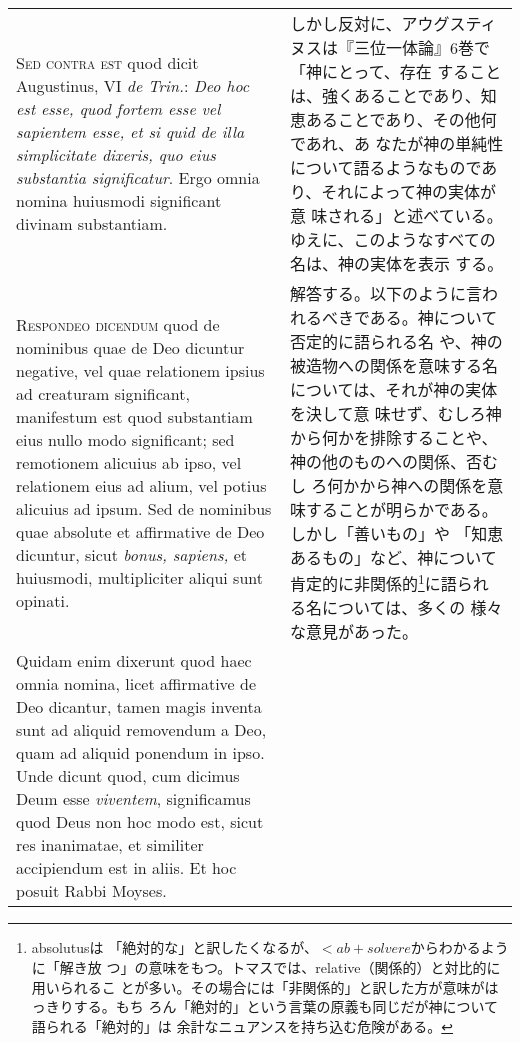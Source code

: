 \documentclass[paper=a4paper,fontsize=10pt,jafontsize=9pt,titlepage]{jlreq}
\begin{document}
\begin{longtable}{p{21em}p{21em}}
\\

{\scshape Sed contra est} quod dicit Augustinus, VI {\itshape de Trin.}: {\itshape
Deo hoc est esse, quod fortem esse vel sapientem esse, et si quid de
illa simplicitate dixeris, quo eius substantia significatur}. Ergo
omnia nomina huiusmodi significant divinam substantiam.

&

しかし反対に、アウグスティヌスは『三位一体論』6巻で「神にとって、存在
することは、強くあることであり、知恵あることであり、その他何であれ、あ
なたが神の単純性について語るようなものであり、それによって神の実体が意
味される」と述べている。ゆえに、このようなすべての名は、神の実体を表示
する。

\\

{\scshape Respondeo dicendum} quod de nominibus quae de Deo dicuntur
negative, vel quae relationem ipsius ad creaturam significant,
manifestum est quod substantiam eius nullo modo significant; sed
remotionem alicuius ab ipso, vel relationem eius ad alium, vel potius
alicuius ad ipsum. Sed de nominibus quae absolute et affirmative de
Deo dicuntur, sicut {\itshape bonus, sapiens,} et huiusmodi, multipliciter
aliqui sunt opinati.

&

解答する。以下のように言われるべきである。神について否定的に語られる名
や、神の被造物への関係を意味する名については、それが神の実体を決して意
味せず、むしろ神から何かを排除することや、神の他のものへの関係、否むし
ろ何かから神への関係を意味することが明らかである。しかし「善いもの」や
「知恵あるもの」など、神について肯定的に非関係的\footnote{absolutusは
「絶対的な」と訳したくなるが、$< ab + solvere$からわかるように「解き放
つ」の意味をもつ。トマスでは、relative（関係的）と対比的に用いられるこ
とが多い。その場合には「非関係的」と訳した方が意味がはっきりする。もち
ろん「絶対的」という言葉の原義も同じだが神について語られる「絶対的」は
余計なニュアンスを持ち込む危険がある。}に語られる名については、多くの
様々な意見があった。

\\

Quidam enim dixerunt quod haec omnia nomina, licet affirmative
de Deo dicantur, tamen magis inventa sunt ad aliquid removendum a Deo,
quam ad aliquid ponendum in ipso. Unde dicunt quod, cum dicimus Deum
esse {\itshape viventem}, significamus quod Deus non hoc modo est, sicut res
inanimatae, et similiter accipiendum est in aliis. Et hoc posuit Rabbi
Moyses. 


\end{longtable}
\end{document}
